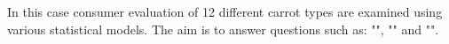 \def\assignmenttitle{Consumer evaluations of carrots}
\def\assignmentdate{23-10-2011}
\def\coursetitle{02418 Statistical modelling}






\maketitle

In this case consumer evaluation of 12 different carrot types are examined using various statistical models. The aim is to answer questions such as: "", "" and "".




